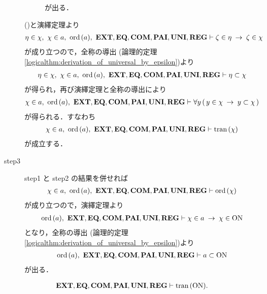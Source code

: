 \begin{sketch}
\begin{description}
\begin{description}
						が出る．
				\end{description}
				()と演繹定理より
				\begin{align}
					\eta \in \chi,\ \chi \in a,\ \ord{a},\ 
					\EXTAX,\EQAX,\COMAX,\PAIAX,\UNIAX,\REGAX \vdash 
					\zeta \in \eta \rarrow \zeta \in \chi
				\end{align}
				が成り立つので，全称の導出
				(論理的定理\ref{logicalthm:derivation_of_universal_by_epsilon})より
				\begin{align}
					\eta \in \chi,\ \chi \in a,\ \ord{a},\ 
					\EXTAX,\EQAX,\COMAX,\PAIAX,\UNIAX,\REGAX \vdash 
					\eta \subset \chi
				\end{align}
				が得られ，再び演繹定理と全称の導出により
				\begin{align}
					\chi \in a,\ \ord{a},\ 
					\EXTAX,\EQAX,\COMAX,\PAIAX,\UNIAX,\REGAX \vdash 
					\forall y\, (\, y \in \chi \rarrow y \subset \chi\, )
				\end{align}
				が得られる．すなわち
				\begin{align}
					\chi \in a,\ \ord{a},\ 
					\EXTAX,\EQAX,\COMAX,\PAIAX,\UNIAX,\REGAX \vdash \tran{\chi}
				\end{align}
				が成立する．
				
			\item[step3] step1 と step2 の結果を併せれば
				\begin{align}
					\chi \in a,\ \ord{a},\ 
					\EXTAX,\EQAX,\COMAX,\PAIAX,\UNIAX,\REGAX \vdash \ord{\chi}
				\end{align}
				が成り立つので，演繹定理より
				\begin{align}
					\operatorname*{ord}\hspace{0.15em}(a),\ \mbox{{\bf EXT}},\mbox{{\bf EQ}},\mbox{\bf COM},\mbox{{\bf PAI}},\mbox{{\bf UNI}},\mbox{{\bf REG}} \vdash 
					\chi \in a \hspace{0.25em}\rightarrow\hspace{0.25em} \chi \in \mathrm{ON}
				\end{align}
				となり，全称の導出
				(論理的定理\ref{logicalthm:derivation_of_universal_by_epsilon})より
				\begin{align}
					\operatorname*{ord}\hspace{0.15em}(a),\ \mbox{{\bf EXT}},\mbox{{\bf EQ}},\mbox{\bf COM},\mbox{{\bf PAI}},\mbox{{\bf UNI}},\mbox{{\bf REG}} \vdash 
					a \subset \mathrm{ON}
				\end{align}
				が出る．
				\QED
		\end{description}
	\end{sketch}
	
	\begin{screen}
		\begin{thm}[$\ON$は推移的]\label{thm:On_is_transitive}
			\begin{align}
				\mbox{{\bf EXT}},\mbox{{\bf EQ}},\mbox{\bf COM},\mbox{{\bf PAI}},\mbox{{\bf UNI}},\mbox{{\bf REG}} \vdash \operatorname*{tran}\hspace{0.15em}(\mathrm{ON}).
			\end{align}
		\end{thm}
	\end{screen}
	
